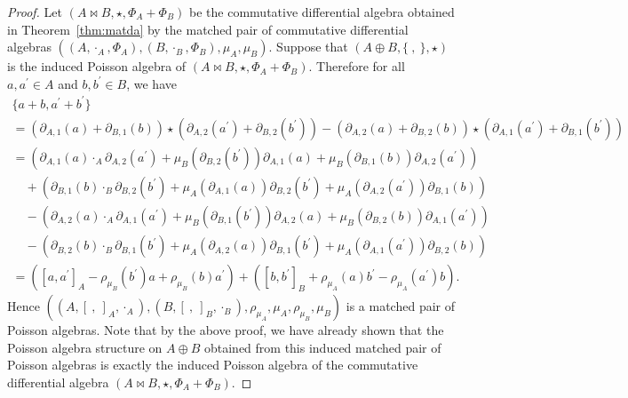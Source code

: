 \documentclass[10pt,a4paper]{amsart}
\numberwithin{equation}{section}
\begin{document}
\begin{proof}
 Let $(A \bowtie B, \star, \Phi_A + \Phi_B)$ be the commutative differential algebra obtained in Theorem~\ref{thm:matda} by the matched pair of commutative differential algebras $((A, \cdot_A, \Phi_A), (B, \cdot_B, \Phi_B), \mu_A, \allowbreak \mu_B)$.
 Suppose that $(A \oplus B, \{\ ,\ \}, \star)$ is the induced Poisson algebra of $(A \bowtie B, \star, \Phi_A + \Phi_B)$.
 Therefore for all $a, a^\prime \in A$ and $b, b^\prime \in B$, we have
 \begin{gather*}
 \{a + b, a^\prime + b^\prime\} \\
 = (\partial_{A,1}(a)+\partial_{B,1}(b)) \star (\partial_{A,2}(a^\prime)+\partial_{B,2}(b^\prime)) - (\partial_{A,2}(a)+\partial_{B,2}(b)) \star (\partial_{A,1}(a^\prime)+\partial_{B,1}(b^\prime)) \\
 = (\partial_{A,1}(a) \cdot_A \partial_{A,2}(a^\prime) + \mu_B(\partial_{B,2}(b^\prime))\partial_{A,1}(a) + \mu_B(\partial_{B,1}(b))\partial_{A,2}(a^\prime)) \\
 \quad + (\partial_{B,1}(b) \cdot_B \partial_{B,2}(b^\prime) + \mu_A(\partial_{A,1}(a))\partial_{B,2}(b^\prime) + \mu_A(\partial_{A,2}(a^\prime))\partial_{B,1}(b)) \\
 \quad - (\partial_{A,2}(a) \cdot_A \partial_{A,1}(a^\prime) + \mu_B(\partial_{B,1}(b^\prime))\partial_{A,2}(a) + \mu_B(\partial_{B,2}(b))\partial_{A,1}(a^\prime)) \\
 \quad - (\partial_{B,2}(b) \cdot_B \partial_{B,1}(b^\prime) + \mu_A(\partial_{A,2}(a))\partial_{B,1}(b^\prime) + \mu_A(\partial_{A,1}(a^\prime))\partial_{B,2}(b)) \\
 = ([a, a^\prime]_A - \rho_{\mu_B}(b^\prime)a + \rho_{\mu_B}(b)a^\prime) + ([b, b^\prime]_B + \rho_{\mu_A}(a)b^\prime - \rho_{\mu_A}(a^\prime)b).
 \end{gather*}
 Hence $((A, [\ ,\ ]_A, \cdot_A), (B, [\ ,\ ]_B, \cdot_B), \rho_{\mu_A}, \mu_A, \rho_{\mu_B}, \mu_B)$ is a matched pair of Poisson algebras.
 Note that by the above proof, we have already shown that the Poisson algebra structure on $A\oplus B$ obtained from this induced matched pair of
 Poisson algebras is exactly the induced Poisson algebra of the
 commutative differential algebra $(A \bowtie B, \star, \Phi_A + \Phi_B)$.
\end{proof}
\end{document}
